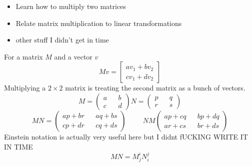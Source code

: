 \documentclass{report}
\begin{document}
\begin{itemize}
\item
Learn how to multiply two matrices
\item
Relate matrix multiplication to linear transformations
\item
other stuff I didn't get in time

\end{itemize}
For a matrix $M$ and a vector $v$
\[
Mv = \begin{bmatrix} av_1 + bv_2 \\ cv_1 + dv_2 \end{bmatrix}
\]
Multiplying a $2 \times 2$ matrix is treating the second matrix as a bunch of vectors.
\[
M = 
\begin{pmatrix}
a && b \\ c && d
\end{pmatrix}
N = 
\begin{pmatrix}
p && q \\ r && s 
\end{pmatrix}
\]
\[
MN = 
\begin{pmatrix}
ap+br && aq + bs \\
cp + dr && cq + ds 
\end{pmatrix}
\hspace{1cm}
NM
\begin{pmatrix}
ap+cq && bp + dq \\
ar + cs && br + ds 
\end{pmatrix}
\]
Einstein notation is actually very useful here but I didnt fUCKING WRITE IT IN TIME
\[
MN = M^i_j N^j_i
\]
\end{document}
